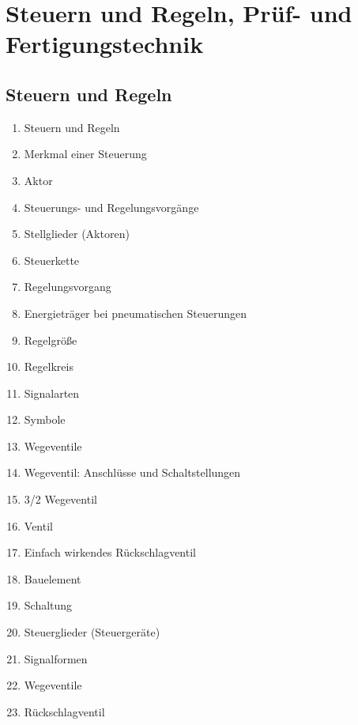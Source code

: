 \section{Steuern und Regeln, Prüf- und
Fertigungstechnik}\label{steuern-und-regeln-pruef--und-fertigungstechnik}

\subsection{Steuern und Regeln}\label{steuern-und-regeln}

\begin{enumerate}
\item
  Steuern und Regeln\\
\item
  Merkmal einer Steuerung\\
\item
  Aktor\\
\item
  Steuerungs- und Regelungsvorgänge\\
\item
  Stellglieder (Aktoren)\\
\item
  Steuerkette\\
\item
  Regelungsvorgang\\
\item
  Energieträger bei pneumatischen Steuerungen\\
\item
  Regelgröße\\
\item
  Regelkreis\\
\item
  Signalarten\\
\item
  Symbole\\
\item
  Wegeventile\\
\item
  Wegeventil: Anschlüsse und Schaltstellungen\\
\item
  3/2 Wegeventil\\
\item
  Ventil\\
\item
  Einfach wirkendes Rückschlagventil\\
\item
  Bauelement\\
\item
  Schaltung\\
\item
  Steuerglieder (Steuergeräte)\\
\item
  Signalformen\\
\item
  Wegeventile\\
\item
  Rückschlagventil
\end{enumerate}

